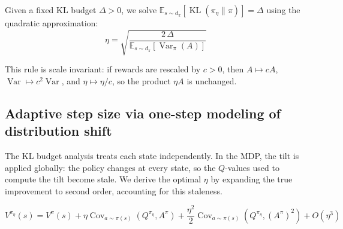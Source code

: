 \documentclass{article}
\theoremstyle{plain}
\theoremstyle{definition}
\theoremstyle{remark}
\newcommand{\E}{\mathbb{E}}
\DeclareMathOperator{\KL}{KL}
\DeclareMathOperator{\Var}{Var}
\DeclareMathOperator{\Cov}{Cov}
\begin{document}
Given a fixed KL budget $\Delta > 0$, we solve $\E_{s \sim d_{\pi}}[\KL(\pi_{\eta} \| \pi)] = \Delta$ using the quadratic approximation:
\begin{equation}\label{eq:eta-rule}
  \boxed{\;\eta = \sqrt{\frac{2\,\Delta}{\E_{s \sim d_{\pi}}[\Var_{\pi}(A)]}}\;}
\end{equation}

This rule is scale invariant: if rewards are rescaled by $c > 0$, then $A \mapsto cA$, $\Var \mapsto c^2\Var$, and $\eta \mapsto \eta/c$, so the product $\eta A$ is unchanged.

\subsection{Adaptive step size via one-step modeling of distribution shift}
\label{sec:optimal-eta}
\label{app:dist-shift}

The KL budget analysis treats each state independently. In the MDP, the tilt is applied globally: the policy changes at every state, so the $Q$-values used to compute the tilt become stale. We derive the optimal $\eta$ by expanding the true improvement to second order, accounting for this staleness.

\begin{equation}\label{eq:V_pi_eta}
  V^{\pi_\eta}(s) = V^\pi(s) + \eta\Cov_{a\sim\pi(s)}(Q^{\pi_\eta},A^\pi) + \frac{\eta^2}{2}\Cov_{a\sim\pi(s)}(Q^{\pi_\eta},(A^\pi)^2) + O(\eta^3)
\end{equation}
\end{document}
